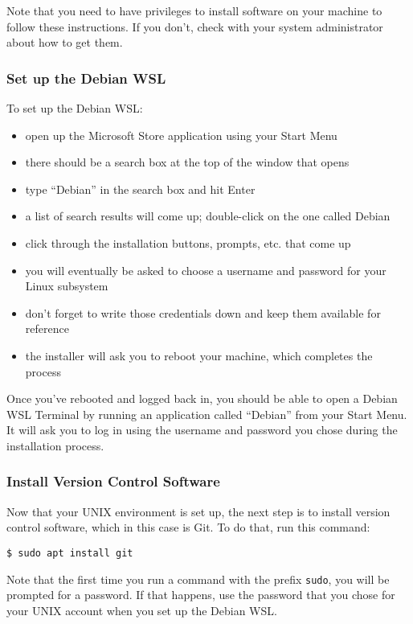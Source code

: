 \documentclass[11pt]{article}
\begin{document}
Note that you need to have privileges to install software on your
machine to follow these instructions.  If you don't, check with your
system administrator about how to get them.

\subsubsection*{Set up the Debian WSL}
\label{sec:orgb2dd17c}

To set up the Debian WSL:

\begin{itemize}
\item open up the Microsoft Store application using your Start Menu
\item there should be a search box at the top of the window that opens
\item type ``Debian'' in the search box and hit Enter
\item a list of search results will come up; double-click on the one
called Debian
\item click through the installation buttons, prompts, etc. that come up
\item you will eventually be asked to choose a username and password for
your Linux subsystem
\item don't forget to write those credentials down and keep them available
for reference
\item the installer will ask you to reboot your machine, which completes
the process
\end{itemize}

Once you've rebooted and logged back in, you should be able to open a
Debian WSL Terminal by running an application called ``Debian'' from
your Start Menu.  It will ask you to log in using the username and
password you chose during the installation process.

\subsubsection*{Install Version Control Software}
\label{sec:org34714b1}

Now that your UNIX environment is set up, the next step is to install
version control software, which in this case is Git.  To do that, run
this command:

\begin{verbatim}
$ sudo apt install git
\end{verbatim}

Note that the first time you run a command with the prefix \texttt{sudo}, you
will be prompted for a password.  If that happens, use the password
that you chose for your UNIX account when you set up the Debian WSL.
\end{document}
